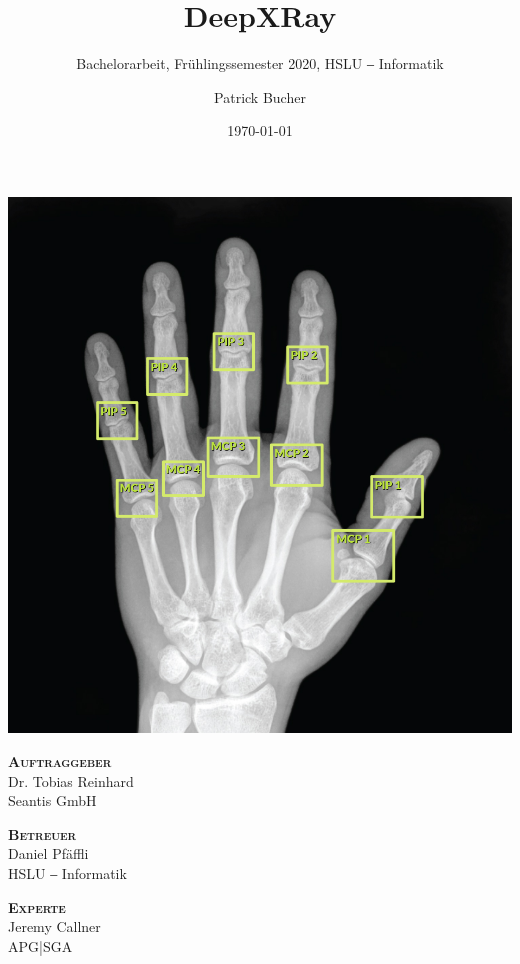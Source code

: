\author{Patrick Bucher}
\title{DeepXRay}
\subtitle{Bachelorarbeit, Frühlingssemester 2020, HSLU ‒ Informatik}
\date{\today}
\maketitle
\thispagestyle{empty}

\begin{center}
\includegraphics[width=0.75\linewidth]{pics/xray-left-hand-annotated.png}
\end{center}

\vfill

\begin{multicols}{3}
    \center

    \noindent
    \textsc{\textbf{Auftraggeber}} \\ Dr. Tobias Reinhard \\ Seantis GmbH

    \noindent
    \textsc{\textbf{Betreuer}} \\ Daniel Pfäffli \\ HSLU ‒ Informatik

    \noindent
    \textsc{\textbf{Experte}} \\ Jeremy Callner \\ APG|SGA
\end{multicols}

\newpage
\thispagestyle{empty}

